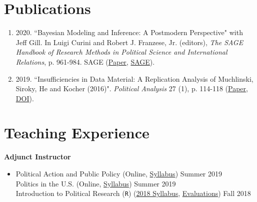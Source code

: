 \documentclass[11pt]{article}
\begin{document}
\begin{flushleft}
\section*{Publications}
\begin{enumerate}[leftmargin=!,labelindent=20pt,itemindent=-20pt]
\item[] 2020. ``Bayesian Modeling and Inference: A Postmodern Perspective" with Jeff Gill. In Luigi Curini and Robert J. Franzese, Jr. (editors), \textit{The SAGE Handbook of Research Methods in Political Science and International Relations}, p. 961-984.  SAGE (\href{https://www.simonheuberger.com/files/research/handbook_bayes.pdf}{Paper}, \href{https://uk.sagepub.com/en-gb/eur/the-sage-handbook-of-research-methods-in-political-science-and-international-relations/book262875}{SAGE}).
\vspace{-0.27cm}
\item[] 2019. ``Insufficiencies in Data Material: A Replication Analysis of Muchlinski, Siroky, He and Kocher (2016)". \textit{Political Analysis} 27 (1), p. 114-118 (\href{https://www.simonheuberger.com/files/research/2019_pa_insufficiencies_in_data_material.pdf}{Paper}, \href{https://www.cambridge.org/core/journals/political-analysis/article/insufficiencies-in-data-material-a-replication-analysis-of-muchlinski-siroky-he-and-kocher-2016/DCFFD3F8F23604794ABE615F10C42FA4}{DOI}).
\end{enumerate}


\section*{Teaching Experience}



\textbf{Adjunct Instructor}

\vspace{-0.3cm}
\begin{itemize}
\item[] Political Action and Public Policy (Online, \href{https://www.simonheuberger.com/files/teaching/syll_summer_2019_102.pdf}{Syllabus}) \hfill{Summer 2019}\\
Politics in the U.S. (Online, \href{https://www.simonheuberger.com/files/teaching/syll_summer_2019_110.pdf}{Syllabus}) \hfill{Summer 2019}\\
Introduction to Political Research (\texttt{R}) (\href{https://www.simonheuberger.com/files/teaching/syll_fall_2018_310.pdf}{2018 Syllabus}, \href{https://www.simonheuberger.com/files/teaching/evals_fall_2018_310.pdf}{Evaluations}) \hfill{Fall 2018}
\end{itemize}



\end{flushleft}
\end{document}
